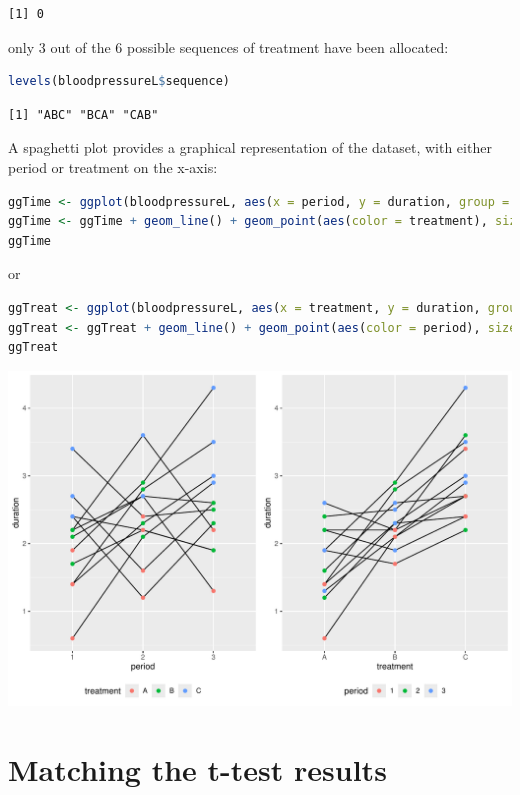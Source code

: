 \documentclass[12pt]{article}
\begin{document}
\label{}
\begin{verbatim}
[1] 0
\end{verbatim}


only 3 out of the 6 possible sequences of treatment have been allocated:
\begin{lstlisting}[language=r,numbers=none]
levels(bloodpressureL$sequence)
\end{lstlisting}

\label{}
\begin{verbatim}
[1] "ABC" "BCA" "CAB"
\end{verbatim}


A spaghetti plot provides a graphical representation of the dataset,
with either period or treatment on the x-axis:
\begin{lstlisting}[language=r,numbers=none]
ggTime <- ggplot(bloodpressureL, aes(x = period, y = duration, group = id))
ggTime <- ggTime + geom_line() + geom_point(aes(color = treatment), size = 2)
ggTime
\end{lstlisting}

or
\begin{lstlisting}[language=r,numbers=none]
ggTreat <- ggplot(bloodpressureL, aes(x = treatment, y = duration, group = id))
ggTreat <- ggTreat + geom_line() + geom_point(aes(color = period), size = 2)
ggTreat
\end{lstlisting}

\begin{center}
\includegraphics[trim={0 0 0 0},width=1\textwidth]{./figures/gg-spaghetti.pdf}
\end{center}

\clearpage
\section{Matching the t-test results}
\label{sec:org0555a47}
\end{document}
